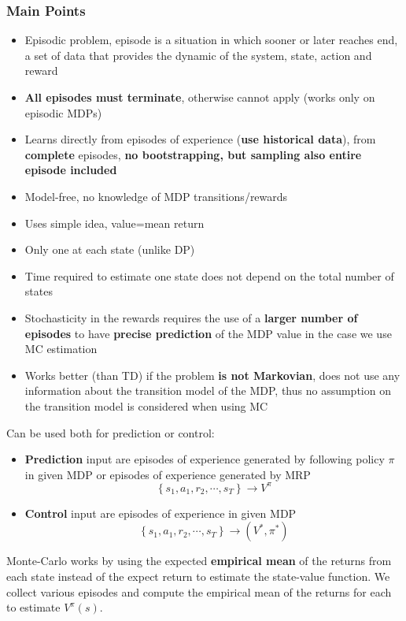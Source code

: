 \subsubsection{Main Points}
    \begin{itemize}
        \item Episodic problem, episode is a situation in which sooner or later reaches end, a set of data that provides the dynamic of the system, state, action and reward
        \item \textbf{All episodes must terminate}, otherwise cannot apply (works only on episodic MDPs)
        \item Learns directly from episodes of experience (\textbf{use historical data}), from \textbf{complete} episodes, \textbf{no bootstrapping, but sampling also entire episode included}
        \item Model-free, no knowledge of MDP transitions/rewards
        \item Uses simple idea, value=mean return
        \item Only one at each state (unlike DP)
        \item Time required to estimate one state does not depend on the total number of states
        \item Stochasticity in the rewards requires the use of a \textbf{larger number of episodes} to have \textbf{precise prediction} of the MDP value in the case we use MC estimation
        \item Works better (than TD) if the problem \textbf{is not Markovian}, does not use any information about the transition model of the MDP, thus no assumption on the transition model is considered when using MC
    \end{itemize}
    Can be used both for prediction or control:
    \begin{itemize}
        \item \textbf{Prediction} input are episodes of experience generated by following policy $\pi$ in given MDP or episodes of experience generated by MRP
        $$\left\{s_1,a_1,r_2,\cdots,s_T\right\}\rightarrow V^\pi$$
        \item \textbf{Control} input are episodes of experience in given MDP
        $$\left\{s_1,a_1,r_2,\cdots,s_T\right\}\rightarrow (V^*,\pi^*)$$
    \end{itemize}
    Monte-Carlo works by using the expected \textbf{empirical mean} of the returns from each state instead of the expect return to estimate the state-value function. We collect various episodes and compute the empirical mean of the returns for each to estimate $V^\pi(s)$.
